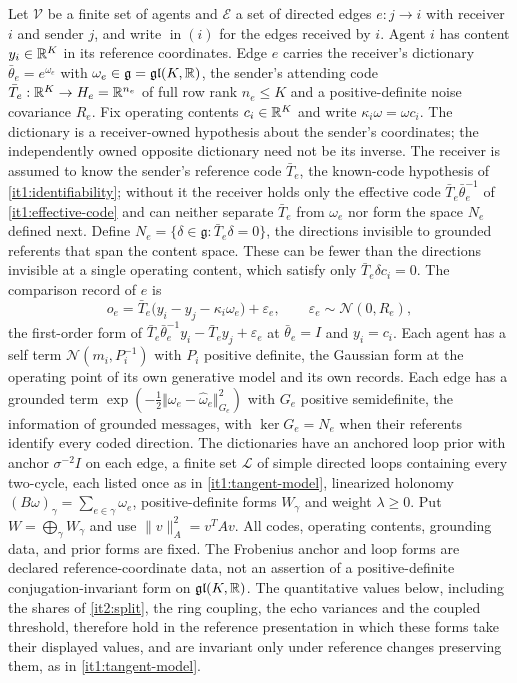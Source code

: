 Let $\mathcal V$ be a finite set of agents and $\mathcal E$ a set of directed edges $e:j\to i$ with receiver $i$ and sender $j$, and write $\operatorname{in}(i)$ for the edges received by $i$. Agent $i$ has content $y_i\in\mathbb R^K$ in its reference coordinates. Edge $e$ carries the receiver's dictionary $\bar\theta_e=e^{\omega_e}$ with $\omega_e\in\mathfrak g=\mathfrak{gl}(K,\mathbb R)$, the sender's attending code $\bar T_e:\mathbb R^K\to H_e=\mathbb R^{n_e}$ of full row rank $n_e\leq K$ and a positive-definite noise covariance $R_e$. Fix operating contents $c_i\in\mathbb R^K$ and write $\kappa_i\omega=\omega c_i$. The dictionary is a receiver-owned hypothesis about the sender's coordinates; the independently owned opposite dictionary need not be its inverse. The receiver is assumed to know the sender's reference code $\bar T_e$, the known-code hypothesis of \cref{it1:identifiability}; without it the receiver holds only the effective code $\bar T_e\bar\theta_e^{-1}$ of \cref{it1:effective-code} and can neither separate $\bar T_e$ from $\omega_e$ nor form the space $N_e$ defined next. Define $N_e=\{\delta\in\mathfrak g:\bar T_e\delta=0\}$, the directions invisible to grounded referents that span the content space. These can be fewer than the directions invisible at a single operating content, which satisfy only $\bar T_e\delta c_i=0$. The comparison record of $e$ is
\begin{equation}
o_e=\bar T_e\bigl(y_i-y_j-\kappa_i\omega_e\bigr)+\varepsilon_e,\qquad\varepsilon_e\sim\mathcal N(0,R_e),
\label{it2:record}
\end{equation}
the first-order form of $\bar T_e\bar\theta_e^{-1}y_i-\bar T_ey_j+\varepsilon_e$ at $\bar\theta_e=I$ and $y_i=c_i$. Each agent has a self term $\mathcal N(m_i,P_i^{-1})$ with $P_i$ positive definite, the Gaussian form at the operating point of its own generative model and its own records. Each edge has a grounded term $\exp(-\frac12\Vert\omega_e-\hat\omega_e\Vert_{G_e}^2)$ with $G_e$ positive semidefinite, the information of grounded messages, with $\ker G_e=N_e$ when their referents identify every coded direction. The dictionaries have an anchored loop prior with anchor $\sigma^{-2}I$ on each edge, a finite set $\mathcal L$ of simple directed loops containing every two-cycle, each listed once as in \cref{it1:tangent-model}, linearized holonomy $(B\omega)_\gamma=\sum_{e\in\gamma}\omega_e$, positive-definite forms $W_\gamma$ and weight $\lambda\geq0$. Put $W=\bigoplus_\gamma W_\gamma$ and use $\|v\|_A^2=v^TAv$. All codes, operating contents, grounding data, and prior forms are fixed. The Frobenius anchor and loop forms are declared reference-coordinate data, not an assertion of a positive-definite conjugation-invariant form on $\mathfrak{gl}(K,\mathbb R)$. The quantitative values below, including the shares of \cref{it2:split}, the ring coupling, the echo variances and the coupled threshold, therefore hold in the reference presentation in which these forms take their displayed values, and are invariant only under reference changes preserving them, as in \cref{it1:tangent-model}.

